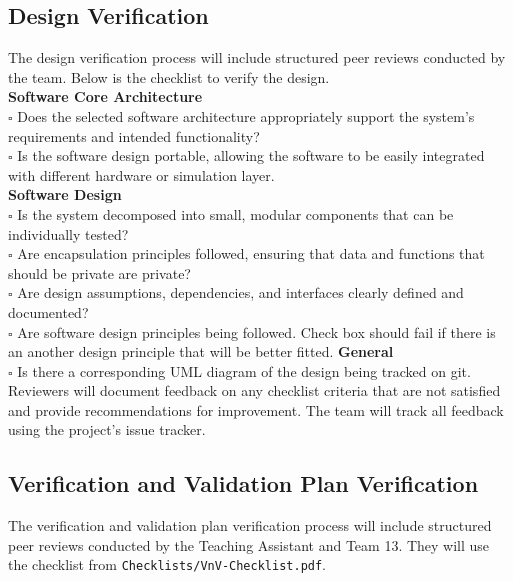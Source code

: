 \documentclass[12pt, titlepage]{article}
\begin{document}
\subsection{Design Verification}\label{sec:design_verification}

The design verification process will include structured peer reviews conducted
by the team. Below is the checklist to verify the design.\\
\newline
\textbf{Software Core Architecture} \\
$\square$ Does the selected software architecture appropriately support the
system's requirements and intended functionality? \\
$\square$ Is the software design portable, allowing the software to be easily
integrated with different hardware or simulation layer. \\
\newline
\newline
\textbf{Software Design} \\
$\square$ Is the system decomposed into small, modular components that can be
individually tested? \\
$\square$ Are encapsulation principles followed, ensuring that data and
functions that should be private are private? \\
$\square$ Are design assumptions, dependencies, and interfaces clearly defined
and documented? \\
$\square$ Are software design principles being followed. Check box should fail
if there is an another design principle that will be better fitted.
\newline
\newline
\textbf{General} \\
$\square$ Is there a corresponding UML diagram of the design being tracked on
git. \\

Reviewers will document feedback on any checklist criteria that are not
satisfied and provide recommendations for improvement. The team will track all
feedback using the project's issue tracker.

\subsection{Verification and Validation Plan Verification}
\label{sec:vnv_plan_verification}

The verification and validation plan verification process will include
structured peer reviews conducted by the Teaching Assistant and Team 13. They
will use the checklist from \texttt{Checklists/VnV-Checklist.pdf}.
\end{document}
